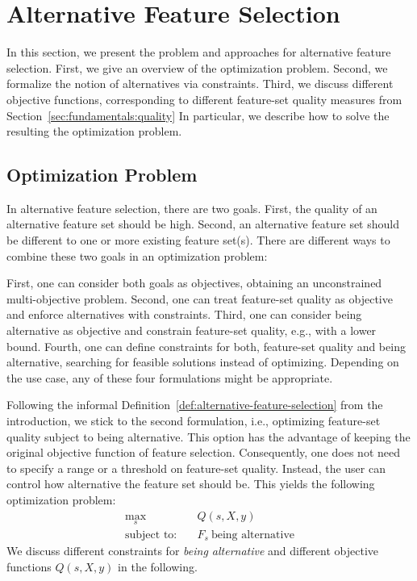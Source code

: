 \documentclass[conference]{IEEEtran}
\theoremstyle{definition}
\begin{document}
\section{Alternative Feature Selection}
\label{sec:approach}

In this section, we present the problem and approaches for alternative feature selection.
First, we give an overview of the optimization problem.
Second, we formalize the notion of alternatives via constraints.
Third, we discuss different objective functions, corresponding to different feature-set quality measures from Section~\ref{sec:fundamentals:quality}
In particular, we describe how to solve the resulting the optimization problem.

\subsection{Optimization Problem}
\label{sec:approach:problem}

In alternative feature selection, there are two goals.
First, the quality of an alternative feature set should be high.
Second, an alternative feature set should be different to one or more existing feature set(s).
There are different ways to combine these two goals in an optimization problem:

First, one can consider both goals as objectives, obtaining an unconstrained multi-objective problem.
Second, one can treat feature-set quality as objective and enforce alternatives with constraints.
Third, one can consider being alternative as objective and constrain feature-set quality, e.g., with a lower bound.
Fourth, one can define constraints for both, feature-set quality and being alternative, searching for feasible solutions instead of optimizing.
Depending on the use case, any of these four formulations might be appropriate.

Following the informal Definition~\ref{def:alternative-feature-selection} from the introduction, we stick to the second formulation, i.e., optimizing feature-set quality subject to being alternative.
This option has the advantage of keeping the original objective function of feature selection.
Consequently, one does not need to specify a range or a threshold on feature-set quality.
Instead, the user can control how alternative the feature set should be.
This yields the following optimization problem:
%
\begin{equation}
	\begin{split}
	\max_s & \quad Q(s,X,y) \\
	\text{subject to:} & \quad F_s~\text{being alternative}
	\end{split}
\label{eq:afs}
\end{equation}
%
We discuss different constraints for \emph{being alternative} and different objective functions $Q(s,X,y)$ in the following.
\end{document}
